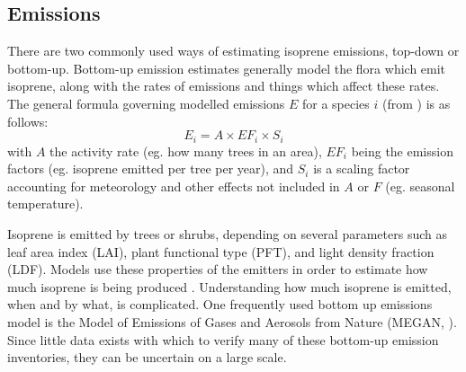   
  \subsection{Emissions}
  
    There are two commonly used ways of estimating isoprene emissions, top-down or bottom-up.
    Bottom-up emission estimates generally model the flora which emit isoprene, along with the rates of emissions and things which affect these rates.
    The general formula governing modelled emissions $E$ for a species $i$ (from \textcite{BrasseurJacob2017}) is as follows:
    \begin{equation*}
      E_i = A \times EF_i \times S_i
    \end{equation*}
    with $A$ the activity rate (eg. how many trees in an area), $EF_i$ being the emission factors (eg. isoprene emitted per tree per year), and $S_i$ is a scaling factor accounting for meteorology and other effects not included in $A$ or $F$ (eg. seasonal temperature).
    
    
    Isoprene is emitted by trees or shrubs, depending on several parameters such as leaf area index (LAI), plant functional type (PFT), and light density fraction (LDF).
    Models use these properties of the emitters in order to estimate how much isoprene is being produced \parencite[eg.][]{Guenther1995,Guenther2006}.
    Understanding how much isoprene is emitted, when and by what, is complicated.
    One frequently used bottom up emissions model is the Model of Emissions of Gases and Aerosols from Nature (MEGAN, \textcite{Guenther1995}).
    Since little data exists with which to verify many of these bottom-up emission inventories, they can be uncertain on a large scale.
    
    
